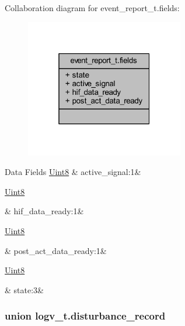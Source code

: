 Collaboration diagram for event\+\_\+report\+\_\+t.\+fields\+:\nopagebreak
\begin{figure}[H]
\begin{center}
\leavevmode
\includegraphics[width=196pt]{d2/dab/a00886}
\end{center}
\end{figure}
\begin{DoxyFields}{Data Fields}
\hypertarget{a00021_a11c00b25b061984b4a8f75f41716e179}{\hyperlink{a00072_af84840501dec18061d18a68c162a8fa2}{Uint8}}\label{a00021_a11c00b25b061984b4a8f75f41716e179}
&
active\+\_\+signal\+:1&
\\
\hline

\hypertarget{a00021_afb47df57891921f25a3bb68da606079e}{\hyperlink{a00072_af84840501dec18061d18a68c162a8fa2}{Uint8}}\label{a00021_afb47df57891921f25a3bb68da606079e}
&
hif\+\_\+data\+\_\+ready\+:1&
\\
\hline

\hypertarget{a00021_a27aab444b44de3d039ee0c60c0b40a6c}{\hyperlink{a00072_af84840501dec18061d18a68c162a8fa2}{Uint8}}\label{a00021_a27aab444b44de3d039ee0c60c0b40a6c}
&
post\+\_\+act\+\_\+data\+\_\+ready\+:1&
\\
\hline

\hypertarget{a00021_a9ed39e2ea931586b6a985a6942ef573e}{\hyperlink{a00072_af84840501dec18061d18a68c162a8fa2}{Uint8}}\label{a00021_a9ed39e2ea931586b6a985a6942ef573e}
&
state\+:3&
\\
\hline

\end{DoxyFields}
\label{d0/dec/a00592}
\hypertarget{a00021_d0/dec/a00592}{}
\subsubsection{union logv\+\_\+t.\+disturbance\+\_\+record}


